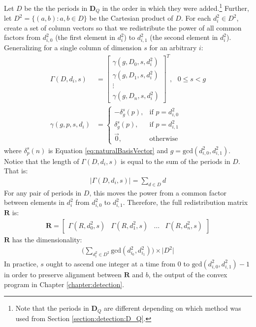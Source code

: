Let $D$ be the the periods in $\bm{D}_Q$ in the order in which they were added.\footnote{Note that the periods in $\bm{D}_Q$ are different depending on which method was used from Section \ref{section:detection:D_Q}.} Further, let $D^{2} = \{(a,b) : a,b \in D \}$ be the Cartesian product of $D$. For each $d_{i}^{2} \in D^2$, create a set of column vectors so that we redistribute the power of all common factors from $d_{i,0}^{2}$ (the first element in $d_{i}^{2}$) to $d_{i,1}^{2}$ (the second element in $d_{i}^{2}$). Generalizing for a single column of dimension $s$ for an arbitrary $i$:
\begin{align}
    \Gamma(D, d_{i}, s) &= \begin{bmatrix}
        \gamma(g, D_0, s, d_{i}^{2}) \\ \gamma(g, D_1, s, d_{i}^{2}) \\ \vdots \\ \gamma(g, D_n, s, d_{i}^{2})
    \end{bmatrix}^{T}, \text{ } 0 \leq s < g \\[1.5em]
%
    \gamma(g, p, s, d_{i}) &=  \begin{cases}
            -\delta_{g}^{s}(p), & \text{if } p = d_{i,0}^{2} \\
            \delta_{g}^{s}(p), & \text{if } p = d_{i,1}^{2} \\
            \overrightarrow{0}, & \text{otherwise}
        \end{cases} \label{eq:extraction:smallGamma}
\end{align}
where $\delta_{p}^{s}(n)$ is Equation \eqref{eq:naturalBasisVector} and $g = \text{gcd}(d_{i,0}^{2}, d_{i,1}^{2})$. Notice that the length of $\Gamma(D, d_{i}, s)$ is equal to the sum of the periods in $D$. That is:
\begin{align*}
    \bigg| \Gamma(D, d_{i}, s) \bigg| = \sum_{d \in D} d
\end{align*}
For any pair of periods in $D$, this moves the power from a common factor between elements in $d_{i}^{2}$ from $d_{i,0}^{2}$ to $d_{i,1}^{2}$. Therefore, the full redistribution matrix $\bm{R}$ is:
\begin{align}\label{eq:extraction:R}
    \bm{R} = \begin{bmatrix}
        \Gamma(R, d_{0}^{2}, s) &
        \Gamma(R, d_{1}^{2}, s) &
        \hdots &
        \Gamma(R, d_{n}^{2}, s)
    \end{bmatrix}
\end{align}
$\bm{R}$ has the dimensionality:
\begin{align}
    \Bigg( \sum_{d_{i}^{2} \in D^{2}} \text{gcd}(d_{i_{0}}^{2}, d_{i_{1}}^{2}) \Bigg) \times \big| D^2 \big|
\end{align}
In practice, $s$ ought to ascend one integer at a time from 0 to $\text{gcd}(d_{i,0}^{2}, d_{i,1}^{2}) - 1$ in order to preserve alignment between $\bm{R}$ and $b$, the output of the convex program in Chapter \ref{chapter:detection}.

